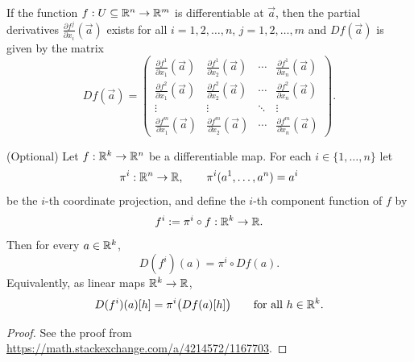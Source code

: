 \begin{proposition}
  \label{total_derivative_matrix}
  If the function $f:U\subseteq \mathbb{R}^n \to \mathbb{R}^m$ is differentiable at $\vec a$, then the partial derivatives 
  $\frac{\partial f^j}{\partial x_i}(\vec a)$ exists for all $i=1,2,\ldots,n$, $j=1,2,\ldots,m$ and $Df(\vec a)$ is given by the matrix
  \[
  Df(\vec a) = \begin{pmatrix}
  \frac{\partial f^1}{\partial x_1}(\vec a) & \frac{\partial f^1}{\partial x_2}(\vec a) & \cdots & \frac{\partial f^1}{\partial x_n}(\vec a)\\
  \frac{\partial f^2}{\partial x_1}(\vec a) & \frac{\partial f^2}{\partial x_2}(\vec a) & \cdots & \frac{\partial f^2}{\partial x_n}(\vec a)\\
  \vdots & \vdots & \ddots & \vdots \\
  \frac{\partial f^m}{\partial x_1}(\vec a) & \frac{\partial f^m}{\partial x_2}(\vec a) & \cdots & \frac{\partial f^m}{\partial x_n}(\vec a)
  \end{pmatrix}.
  \]
\end{proposition} 
\begin{proposition}{(Optional)}
Let $f:\mathbb{R}^{k}\to\mathbb{R}^{n}$ be a differentiable map. For each $i\in\{1,\dots,n\}$ let
\[
\pi^i:\mathbb{R}^n\to\mathbb{R},\qquad \pi^i(a^1,\dots,a^n)=a^i
\]
be the $i$-th coordinate projection, and define the $i$-th component function of $f$ by
\[
f^i := \pi^i\circ f:\mathbb{R}^k\to\mathbb{R}.
\]
Then for every $a\in\mathbb{R}^k$,
\[
D(f^i)(a) = \pi^i\circ Df(a).
\]
Equivalently, as linear maps $\mathbb{R}^k\to\mathbb{R}$,
\[
D(f^i)(a)[h] = \pi^i\big(Df(a)[h]\big)\qquad\text{for all }h\in\mathbb{R}^k.
\]
\end{proposition}
\begin{proof}
  See the proof from \url{https://math.stackexchange.com/a/4214572/1167703}.
\end{proof}

